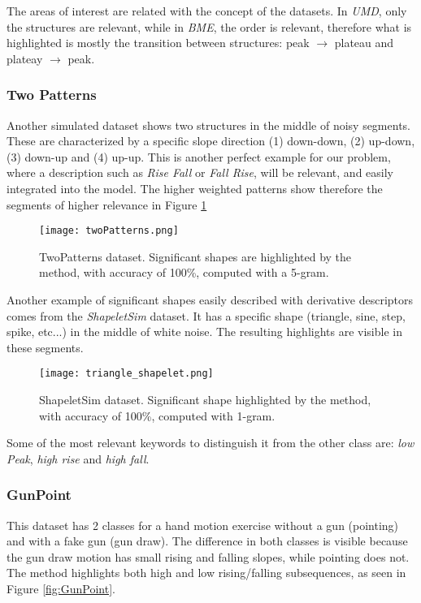 {The areas of interest are related with the concept of the datasets. In \textit{UMD}, only the structures are relevant, while in \textit{BME}, the order is relevant, therefore what is highlighted is mostly the transition between structures: peak $\rightarrow$ plateau and plateay $\rightarrow$ peak.

\subsubsection{Two Patterns}

Another simulated dataset shows two structures in the middle of noisy segments. These are characterized by a specific slope direction (1) down-down, (2) up-down, (3) down-up and (4) up-up. This is another perfect example for our problem, where a description such as \textit{Rise Fall} or \textit{Fall Rise}, will be relevant, and easily integrated into the model. The higher weighted patterns show therefore the segments of higher relevance in Figure \ref{fig:twoPatterns}

\begin{figure}
    \centering
    \texttt{[image: twoPatterns.png]}
    \caption{TwoPatterns dataset. Significant shapes are highlighted by the method, with accuracy of 100\%, computed with a 5-gram.}
    \label{fig:twoPatterns}
\end{figure}

Another example of significant shapes easily described with derivative descriptors comes from the \textit{ShapeletSim} dataset. It has a specific shape (triangle, sine, step, spike, etc...) in the middle of white noise. The resulting highlights are visible in these segments. 

\begin{figure}
    \centering
    \texttt{[image: triangle\_shapelet.png]}
    \caption{ShapeletSim dataset. Significant shape highlighted by the method, with accuracy of 100\%, computed with 1-gram.}
    \label{fig:shapeletSim}
\end{figure}

Some of the most relevant keywords to distinguish it from the other class are: \textit{low Peak}, \textit{high rise} and \textit{high fall}. 

\subsubsection{GunPoint}
This dataset has 2 classes for a hand motion exercise without a gun (pointing) and with a fake gun (gun draw). The difference in both classes is visible because the gun draw motion has small rising and falling slopes, while pointing does not. The method highlights both high and low rising/falling subsequences, as seen in Figure \ref{fig:GunPoint}.

}
